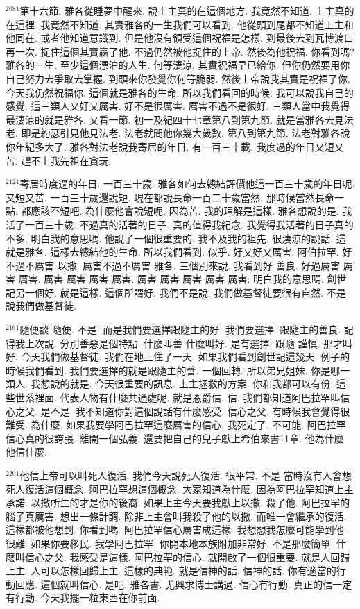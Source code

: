 \documentclass{book}
\begin{document}
$^{2081}$第十六節.
雅各從睡夢中醒來.
說上主真的在這個地方.
我竟然不知道.
上主真的在這裡.
我竟然不知道.
其實雅各的一生我們可以看到.
他從頭到尾都不知道上主和他同在.
或者他知道意識到.
但是他沒有領受這個祝福是怎樣.
到最後去到瓦博渡口再一次.
捉住這個其實贏了他.
不過仍然被他捉住的上帝.
然後為他祝福.
你看到嗎?雅各的一生.
至少這個漂泊的人生.
何等淒涼.
其實祝福早已給你.
但你仍然要用你自己努力去爭取去掌握.
到頭來你發覺你何等脆弱.
然後上帝說我其實是祝福了你.
今天我仍然祝福你.
這個就是雅各的生命.
所以我們看回的時候.
我可以說我自己的感覺.
這三類人又好又厲害.
好不是很厲害.
厲害不過不是很好.
三類人當中我覺得最淒涼的就是雅各.
又看一節.
初一及紀四十七章第八到第九節.
就是當雅各去見法老.
即是約瑟引見他見法老.
法老就問他你幾大歲數.
第八到第九節.
法老對雅各說你年紀多大了.
雅各對法老說我寄居的年日.
有一百三十載.
我度過的年日又短又苦.
趕不上我先祖在貪玩.

$^{2121}$寄居時度過的年日.
一百三十歲.
雅各如何去總結評價他這一百三十歲的年日呢.
又短又苦.
一百三十歲還說短.
現在都說長命一百二十歲當然.
那時候當然長命一點.
都應該不短吧.
為什麼他會說短呢.
因為苦.
我的理解是這樣.
雅各想說的是.
我活了一百三十歲.
不過真的活著的日子.
真的值得我紀念.
我覺得我活著的日子真的不多.
明白我的意思嗎.
他說了一個很重要的.
我不及我的祖先.
很淒涼的說話.
這就是雅各.
這樣去總結他的生命.
所以我們看到.
似乎.
好又好又厲害.
阿伯拉罕.
好不過不厲害 以撒.
厲害不過不厲害 雅各.
三個別來說.
我看到好 善良.
好過厲害 厲害 厲害.
厲害 厲害 厲害 厲害.
厲害 厲害 厲害 厲害 厲害.
明白我的意思嗎.
創世記另一個好.
就是這樣.
這個所謂好.
我們不是說.
我們做基督徒要很有自然.
不是說我們做基督徒.

$^{2161}$隨便談 隨便.
不是.
而是我們要選擇跟隨主的好.
我們要選擇.
跟隨主的善良.
記得我上次說.
分別善惡是個特點.
什麼叫善 什麼叫好.
是有選擇.
跟隨 謹慎.
那才叫好.
今天我們做基督徒.
我們在地上住了一天.
如果我們看到創世記這幾天.
例子的時候我們看到.
我們要選擇的就是跟隨主的善.
一個回轉.
所以弟兄姐妹.
你是哪一類人.
我想說的就是.
今天很重要的訊息.
上主拯救的方案.
你和我都可以有份.
這些世系裡面.
代表人物有什麼共通處呢.
就是恩爵信.
信.
我們都知道阿巴拉罕叫信心之父.
是不是.
我不知道你對這個說話有什麼感受.
信心之父.
有時候我會覺得很難受.
為什麼.
如果我要學阿巴拉罕這麼厲害的信心.
我死定了.
不可能.
阿巴拉罕信心真的很誇張.
離開一個弘義.
還要把自己的兒子獻上希伯來書11章.
他為什麼 他信什麼.

$^{2201}$他信上帝可以叫死人復活.
我們今天說死人復活.
很平常.
不是 當時沒有人會想死人復活這個概念.
阿巴拉罕想這個概念.
大家知道為什麼.
因為阿巴拉罕知道上主承諾.
以撒所生的才是你的後裔.
如果上主今天要我獻上以撒.
殺了他.
阿巴拉罕的腦子真厲害.
想出一條計調.
除非上主會叫我殺了他的以撒.
而唯一會繼承的復活.
這樣都被他想到.
你看到嗎.
阿巴拉罕信心厲害成這樣.
我想想我怎麼可能學到他.
很難.
如果你要移民.
我學阿巴拉罕.
你開本地本族附加非常好.
不是那麼簡單.
什麼叫信心之父.
我感受是這樣.
阿巴拉罕的信心.
就開啟了一個很重要.
就是人回歸上主.
人可以怎樣回歸上主.
這樣的典範.
就是信神的話.
信神的話.
你有適當的行動回應.
這個就叫信心.
是吧.
雅各書.
尤興求博士講過.
信心有行動.
真正的信一定有行動.
今天我擺一粒東西在你前面.
\end{document}
